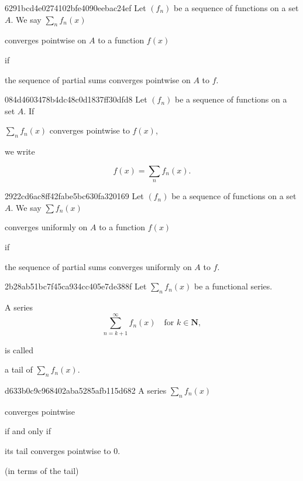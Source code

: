 \begin{note}{6291bcd4e0274102bfe4090eebac24ef}
    Let \({ (f_n) }\) be a sequence of functions on a set \({ A }\).
    We say \({ \sum_n f_n(x) }\) \begin{icloze}{2}converges pointwise on \({ A }\) to a function \({ f(x) }\)\end{icloze} if \begin{icloze}{1}the sequence of partial sums converges pointwise on \({ A }\) to \({ f }\).\end{icloze}
\end{note}

\begin{note}{084d4603478b4dc48c0d1837ff30dfd8}
    Let \({ (f_n) }\) be a sequence of functions on a set \({ A }\).
    If \begin{icloze}{2}\({ \sum_n f_n(x) }\) converges pointwise to \({ f(x) }\),\end{icloze} we write
    \begin{icloze}{1}
        \[
            f(x) = \sum_n f_n(x).
        \]
    \end{icloze}
\end{note}

\begin{note}{2922cd6ac8ff42fabe5bc630fa320169}
    Let \({ (f_n) }\) be a sequence of functions on a set \({ A }\).
    We say \({ \sum f_n(x) }\) \begin{icloze}{2}converges uniformly on \({ A }\) to a function \({ f(x) }\)\end{icloze} if \begin{icloze}{1}the sequence of partial sums converges uniformly on \({ A }\) to \({ f }\).\end{icloze}
\end{note}

\begin{note}{2b28ab51bc7f45ca934cc405e7de388f}
    Let \({ \sum_n f_n(x) }\) be a functional series.
    \begin{icloze}{1}
        A series
        \[
            \sum_{n=k+1}^{\infty} f_n(x) \quad \text{for } k \in \mathbf{N},
        \]
    \end{icloze}
    is called \begin{icloze}{2}a tail of \({ \sum_n f_n(x) }\).\end{icloze}
\end{note}

\begin{note}{d633b0c9c968402aba5285afb115d682}
    A series \({ \sum_n f_n(x) }\) \begin{icloze}{2}converges pointwise\end{icloze} \begin{icloze}{3}if and only if\end{icloze} \begin{icloze}{1}its tail converges pointwise to \({ 0 }\).\end{icloze}

    \begin{center}
        \tiny
        (in terms of the tail)
    \end{center}
\end{note}


